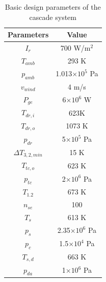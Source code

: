 \documentclass{article}
\begin{document}
\begin{table}[htbp]
	\caption{Basic design parameters of the cascade system}
	\begin{center}
	\begin{tabular}{cc}
		\toprule
		Parameters			&	Value\\
		\midrule
		$I_r$			&	700 W/m$^2$\\
		$T_{amb}$			&	293 K\\
		$p_{amb}$			&	1.013$\times10^5$ Pa\\
		$v_{wind}$			&	4 m/s\\
		$P_{ge}$		&	6$\times10^6$ W\\
		$T_{dr,i}$	&	623K\\
		$T_{dr,o}$	&	1073 K\\
		$p_{dr}$			&	5$\times10^5$ Pa\\
		$\Delta{}T_{3,2,min}$	&	15 K \\
		$T_{tc,o}$	&	623 K\\
		$p_{tc}$		&	2$\times10^6$ Pa\\
		$T_{1.2}$	&	673 K\\
		$n_{se}$	&	100\\
		$T_s$				&	613 K\\
		$p_s$				&	2.35$\times10^6$ Pa\\
		$p_c$				&	1.5$\times10^4$ Pa\\
		$T_{s,d}$			&	663 K\\
		$p_{da}$ & 1$\times10^6$ Pa\\
		\bottomrule
	\end{tabular}
	\end{center}
	\label{tab:system-data}
\end{table}
\end{document}
